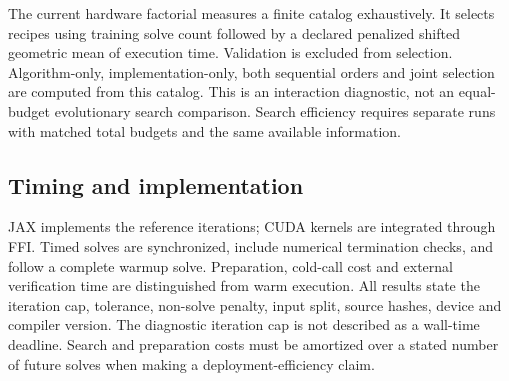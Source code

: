 The current hardware factorial measures a finite catalog exhaustively. It
selects recipes using training solve count followed by a declared penalized
shifted geometric mean of execution time. Validation is excluded from selection.
Algorithm-only, implementation-only, both sequential orders and joint selection
are computed from this catalog. This is an interaction diagnostic, not an
equal-budget evolutionary search comparison. Search efficiency requires separate
runs with matched total budgets and the same available information.

\subsection{Timing and implementation}

JAX implements the reference iterations; CUDA kernels are integrated through
FFI. Timed solves are synchronized, include numerical termination checks, and
follow a complete warmup solve. Preparation, cold-call cost and external
verification time are distinguished from warm execution. All results state the
iteration cap, tolerance, non-solve penalty, input split, source hashes, device
and compiler version. The diagnostic iteration cap is not described as a
wall-time deadline. Search and preparation costs must be amortized over a stated
number of future solves when making a deployment-efficiency claim.

